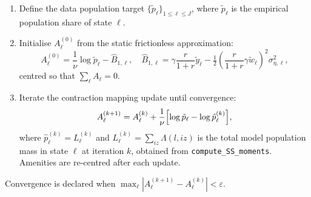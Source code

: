 \documentclass[12pt, a4paper]{article}
\begin{document}
\begin{enumerate}[noitemsep]
  \item Define the data population target $\{\tilde p_\ell\}_{1\le \ell \le J}$, where $\tilde p_\ell$ is the empirical population share of state $\ell$.
  \item Initialise $A_\ell^{(0)}$ from the static frictionless approximation:
    \begin{equation}
      A_\ell^{(0)} = \frac{1}{\nu} \log \tilde p_\ell - \hat B_{1,\ell}, \quad
      \hat B_{1,\ell} = \gamma\frac{r}{1+r}\tilde y_\ell - \tfrac{1}{2}(\frac{r}{1+r}\gamma\tilde w_\ell)^2\sigma^2_{\eta,\ell},
      \label{eq:A_init}
    \end{equation}
    centred so that $\sum_\ell A_\ell = 0$.
  \item Iterate the contraction mapping update until convergence:
    \begin{equation}
      A_\ell^{(k+1)} = A_\ell^{(k)} + \frac{1}{\nu}
      \Bigl[\log \tilde p_\ell - \log \hat p_\ell^{(k)}\Bigr], \label{eq:BLP}
    \end{equation}
    where $\hat p_\ell^{(k)} = L_\ell^{(k)}$ and $L_\ell^{(k)} = \sum_{iz} \Lambda(l,iz)$ is the total model population mass in state $\ell$ at iteration $k$, obtained from \texttt{compute\_SS\_moments}. Amenities are re-centred after each update.
\end{enumerate}
Convergence is declared when $\max_\ell |A_\ell^{(k+1)} - A_\ell^{(k)}| < \varepsilon$. 
\end{document}
